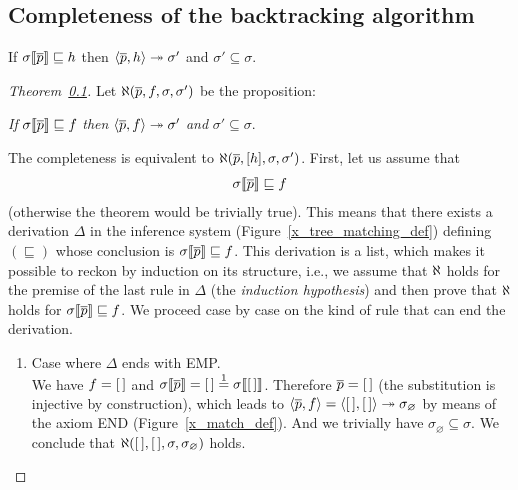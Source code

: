 
\subsection{Completeness of the backtracking algorithm}
\label{backtracking:completeness_proof}

\begin{theorem}[Completeness]\hfill
\begin{center}
If   \(\subst{\overline{p}}{\sigma} \sqsubseteq h\)
then \(\smat{h}{\overline{p}} \twoheadrightarrow \sigma'\) 
and  \(\sigma' \subseteq \sigma\).
\end{center}
\end{theorem}

\begin{proof}[Theorem~\ref{backtracking:completeness_proof}] Let
  \(\ind{W}(\overline{p}, f, \sigma, \sigma')\) be the proposition:
\begin{center}
\emph{If}   \(\subst{\overline{p}}{\sigma} \sqsubseteq f\)
\emph{then} \(\smj{f}{\overline{p}}{\sigma'}\)
\emph{and} \(\sigma' \subseteq \sigma\).
\end{center}
The completeness is equivalent to \(\ind{W}(\overline{p}, [h], \sigma,
\sigma')\). First, let us assume that
\begin{align}
  \subst{\overline{p}}{\sigma} \sqsubseteq f \label{x:compl:1}
\end{align}
(otherwise the theorem would be trivially true). This means that there
exists a derivation \(\Delta\) in the inference system
(Figure~\ref{x_tree_matching_def}) defining \((\sqsubseteq)\) whose
conclusion is \(\subst{\overline{p}}{\sigma} \sqsubseteq f\). This
derivation is a list, which makes it possible to reckon by induction
on its structure, i.e., we assume that \(\ind{W}\) holds for the
premise of the last rule in \(\Delta\) (the \emph{induction
hypothesis}) and then prove that \(\ind{W}\) holds for
\(\subst{\overline{p}}{\sigma} \sqsubseteq f\). We proceed case by
case on the kind of rule that can end the derivation.
\begin{enumerate}

  \item Case where \(\Delta\) ends with \textsf{EMP}.\\ We have \(f =
    \el\) and \(\subst{\overline{p}}{\sigma} = \el \eqn{1}
    \subst{\el}{\sigma}\). Therefore \(\overline{p} = \el\) (the
    substitution is injective by construction), which leads to
    \(\smat{f}{\overline{p}} = \smj{\el}{\el}{\sigma_\varnothing}\) by
    means of the axiom \textsf{END} (Figure~\ref{x_match_def}). And we
    trivially have \(\sigma_\varnothing \subseteq \sigma\). We
    conclude that \(\ind{W}(\el, \el, \sigma, \sigma_\varnothing)\)
    holds.


\end{enumerate}
\end{proof}
